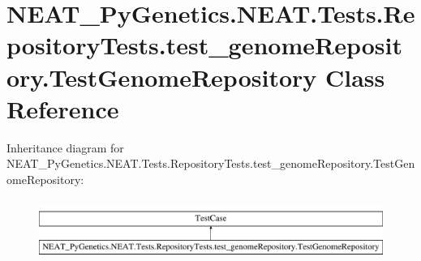 \hypertarget{classNEAT__PyGenetics_1_1NEAT_1_1Tests_1_1RepositoryTests_1_1test__genomeRepository_1_1TestGenomeRepository}{}\section{N\+E\+A\+T\+\_\+\+Py\+Genetics.\+N\+E\+A\+T.\+Tests.\+Repository\+Tests.\+test\+\_\+genome\+Repository.\+Test\+Genome\+Repository Class Reference}
\label{classNEAT__PyGenetics_1_1NEAT_1_1Tests_1_1RepositoryTests_1_1test__genomeRepository_1_1TestGenomeRepository}
Inheritance diagram for N\+E\+A\+T\+\_\+\+Py\+Genetics.\+N\+E\+A\+T.\+Tests.\+Repository\+Tests.\+test\+\_\+genome\+Repository.\+Test\+Genome\+Repository\+:\begin{figure}[H]
\begin{center}
\leavevmode
\includegraphics[height=2.000000cm]{classNEAT__PyGenetics_1_1NEAT_1_1Tests_1_1RepositoryTests_1_1test__genomeRepository_1_1TestGenomeRepository}
\end{center}
\end{figure}
